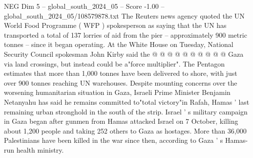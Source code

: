 \begin{textsample}{NEG Dim 5 – global\_south\_2024\_05 – Score -1.00 – global\_south\_2024\_05/108579878.txt}
The Reuters news agency quoted the UN World Food Programme ( WFP ) spokesperson as saying that the UN has transported a total of 137 lorries of aid from the pier -- approximately 900 metric tonnes -- since it began operating.
At the White House on Tuesday, National Security Council spokesman John Kirby said the @ @ @ @ @ @ @ @ @ @ Gaza via land crossings, but instead could be a"force multiplier".
The Pentagon estimates that more than 1,000 tonnes have been delivered to shore, with just over 900 tonnes reaching UN warehouses.
Despite mounting concerns over the worsening humanitarian situation in Gaza, Israeli Prime Minister Benjamin Netanyahu has said he remains committed to"total victory"in Rafah, Hamas ' last remaining urban stronghold in the south of the strip.
Israel ' s military campaign in Gaza began after gunmen from Hamas attacked Israel on 7 October, killing about 1,200 people and taking 252 others to Gaza as hostages.
More than 36,000 Palestinians have been killed in the war since then, according to Gaza ' s Hamas-run health ministry.

\end{textsample}
